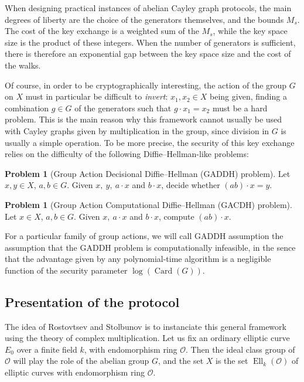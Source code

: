 \documentclass{article}
\renewcommand{\O}{\mathcal{O}}
\theoremstyle{definition}
\newtheorem{prob}[theorem]{Problem}
\DeclareMathOperator{\Card}{Card}
\DeclareMathOperator{\Ell}{Ell}
\begin{document}
When designing practical instances of abelian Cayley graph
protocols, the main degrees of liberty are the choice of the generators themselves,
and the bounds $M_s$. The cost of the key exchange is a weighted
sum of the $M_s$, while the key space size is the product of these integers. When
the number of generators is sufficient, there is therefore an exponential gap
between the key space size and the cost of the walks.

Of course, in order to be
cryptographically interesting, the action of the group $G$ on $X$ must in particular
be difficult to \emph{invert}: $x_1, x_2\in X$ being given, finding a combination
$g\in G$ of the generators such that $g\cdot x_1 = x_2$ must be a hard problem.
This is the main reason why this framework cannot usually be used with
Cayley graphs given by multiplication in the group, since division in $G$ is usually
a simple operation. To be more precise, the security of this key exchange relies
on the difficulty of the following Diffie--Hellman-like problems:

\begin{prob}[Group Action Decisional Diffie--Hellman (GADDH) problem] Let $x, y\in X$,
$a, b\in G$. Given $x,\ y,\ a\cdot x$ and $b\cdot x$, decide whether $(ab)\cdot x = y$.
\end{prob}

\begin{prob}[Group Action Computational Diffie--Hellman (GACDH) problem] Let $x\in X$,
$a, b\in G$. Given $x,\ a\cdot x$ and $b\cdot x$, compute $(ab)\cdot x$.
\end{prob}

For a particular family of group actions, we will call GADDH assumption the assumption
that the GADDH problem is computationally infeasible, in the sence that the advantage
given by any polynomial-time algorithm is a negligible function of the security parameter
$\log(\Card(G))$.

\subsection{Presentation of the protocol}

The idea of Rostovtsev and Stolbunov is to instanciate this general framework
using the theory of complex multiplication.
Let us fix an ordinary elliptic curve $E_0$ over a finite field $k$, with
endomorphism ring $\O$. Then the ideal class group of $\O$ will play the role of
the abelian group $G$, and the set $X$ is the set $\Ell_k(\O)$ of elliptic curves
with endomorphism ring $\O$.
\end{document}
